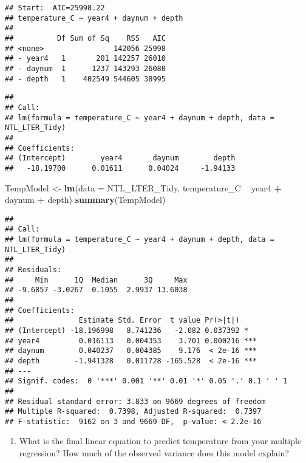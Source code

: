 \documentclass[]{article}
\newenvironment{Shaded}{\begin{snugshade}}{\end{snugshade}}
\newcommand{\KeywordTok}[1]{\textcolor[rgb]{0.13,0.29,0.53}{\textbf{#1}}}
\newcommand{\DataTypeTok}[1]{\textcolor[rgb]{0.13,0.29,0.53}{#1}}
\newcommand{\StringTok}[1]{\textcolor[rgb]{0.31,0.60,0.02}{#1}}
\newcommand{\OperatorTok}[1]{\textcolor[rgb]{0.81,0.36,0.00}{\textbf{#1}}}
\newcommand{\NormalTok}[1]{#1}
\providecommand{\tightlist}{%
  \setlength{\itemsep}{0pt}\setlength{\parskip}{0pt}}
\begin{document}
\begin{verbatim}
## Start:  AIC=25998.22
## temperature_C ~ year4 + daynum + depth
## 
##          Df Sum of Sq    RSS   AIC
## <none>                142056 25998
## - year4   1       201 142257 26010
## - daynum  1      1237 143293 26080
## - depth   1    402549 544605 38995
\end{verbatim}

\begin{verbatim}
## 
## Call:
## lm(formula = temperature_C ~ year4 + daynum + depth, data = NTL_LTER_Tidy)
## 
## Coefficients:
## (Intercept)        year4       daynum        depth  
##   -18.19700      0.01611      0.04024     -1.94133
\end{verbatim}

\begin{Shaded}
\begin{Highlighting}[]
\NormalTok{TempModel <-}\StringTok{ }\KeywordTok{lm}\NormalTok{(}\DataTypeTok{data =}\NormalTok{ NTL_LTER_Tidy, temperature_C }\OperatorTok{~}\StringTok{ }\NormalTok{year4 }\OperatorTok{+}\StringTok{ }\NormalTok{daynum }\OperatorTok{+}\StringTok{ }\NormalTok{depth)}
\KeywordTok{summary}\NormalTok{(TempModel)}
\end{Highlighting}
\end{Shaded}

\begin{verbatim}
## 
## Call:
## lm(formula = temperature_C ~ year4 + daynum + depth, data = NTL_LTER_Tidy)
## 
## Residuals:
##     Min      1Q  Median      3Q     Max 
## -9.6857 -3.0267  0.1055  2.9937 13.6038 
## 
## Coefficients:
##               Estimate Std. Error  t value Pr(>|t|)    
## (Intercept) -18.196998   8.741236   -2.082 0.037392 *  
## year4         0.016113   0.004353    3.701 0.000216 ***
## daynum        0.040237   0.004385    9.176  < 2e-16 ***
## depth        -1.941328   0.011728 -165.528  < 2e-16 ***
## ---
## Signif. codes:  0 '***' 0.001 '**' 0.01 '*' 0.05 '.' 0.1 ' ' 1
## 
## Residual standard error: 3.833 on 9669 degrees of freedom
## Multiple R-squared:  0.7398, Adjusted R-squared:  0.7397 
## F-statistic:  9162 on 3 and 9669 DF,  p-value: < 2.2e-16
\end{verbatim}

\begin{enumerate}
\def\labelenumi{\arabic{enumi}.}
\setcounter{enumi}{12}
\tightlist
\item
  What is the final linear equation to predict temperature from your
  multiple regression? How much of the observed variance does this model
  explain?
\end{enumerate}
\end{document}
